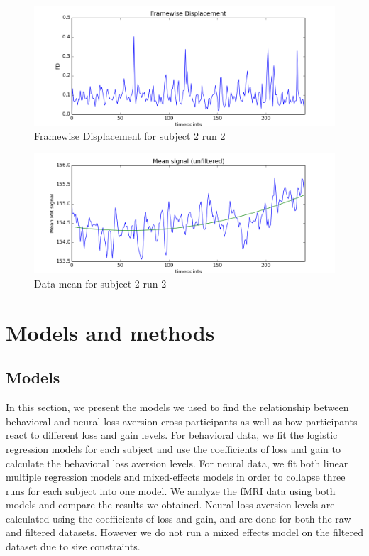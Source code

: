 \documentclass[11pt]{article}
\begin{document}
\begin{figure}[H]
    \centering
        \includegraphics[scale=0.4]{figures/fd_sub2run2.png}
    \caption{Framewise Displacement for subject 2 run 2}
\end{figure}

\begin{figure}[H]
    \centering
        \includegraphics[scale=0.4]{figures/mean_sub2run2.png}
    \caption{Data mean for subject 2 run 2}
\end{figure}

\section{Models and methods}

\subsection{Models}

In this section, we present the models we used to find the relationship between behavioral and neural loss aversion cross participants as well as how participants react to different loss and gain levels. For behavioral data, we fit the logistic regression models for each subject and use the coefficients of loss and gain to calculate the behavioral loss aversion levels. For neural data, we fit both linear multiple regression models and mixed-effects models in order to collapse three runs for each subject into one model. We analyze the fMRI data using both models and compare the results we obtained. Neural loss aversion levels are calculated using the coefficients of loss and gain, and are done for both the raw and filtered datasets. However we do not run a mixed effects model on the filtered dataset due to size constraints.   
\end{document}
